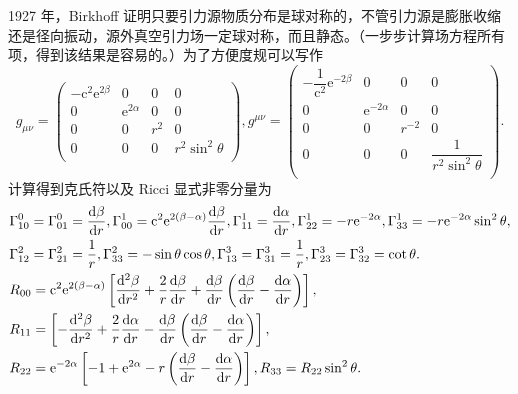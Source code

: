 \documentclass[11pt, a4paper, oneside, onecolumn]{ctexart}
\numberwithin{equation}{subsection}
\begin{document}
1927 年，Birkhoff 证明只要引力源物质分布是球对称的，不管引力源是膨胀收缩还是径向振动，源外真空引力场一定球对称，而且静态。（一步步计算场方程所有项，得到该结果是容易的。）为了方便度规可以写作
\begin{equation}
g_{\mu\nu}=\begin{pmatrix}
-\mathrm{c}^{2}\mathrm{e}^{2\beta} & 0 & 0 & 0\\
0 & \mathrm{e}^{2\alpha} & 0 & 0\\
0 & 0 & r^{2} & 0\\
0 & 0 & 0 & r^{2}\sin^{2}\theta\\
\end{pmatrix},
g^{\mu\nu}=\begin{pmatrix}
-\dfrac{1}{\mathrm{c}^{2}}\mathrm{e}^{-2\beta} & 0 & 0 & 0\\
0 & \mathrm{e}^{-2\alpha} & 0 & 0\\
0 & 0 & r^{-2} & 0\\
0 & 0 & 0 & \dfrac{1}{r^{2}\sin^{2}\theta}\\
\end{pmatrix}.
\end{equation}
计算得到克氏符以及 Ricci 显式非零分量为
\begin{align}
&\Gamma_{10}^{0}=\Gamma_{01}^{0}=\frac{\mathrm{d}\beta}{\mathrm{d}r},\Gamma_{00}^{1}=\mathrm{c}^{2}\mathrm{e}^{2\left(\beta-\alpha\right)}\frac{\mathrm{d}\beta}{\mathrm{d}r},\Gamma_{11}^{1}=\frac{\mathrm{d}\alpha}{\mathrm{d}r},\Gamma_{22}^{1}=-r\mathrm{e}^{-2\alpha},\Gamma_{33}^{1}=-r\mathrm{e}^{-2\alpha}\sin^{2}\theta,\notag\\
&\Gamma_{12}^{2}=\Gamma_{21}^{2}=\frac{1}{r},\Gamma_{33}^{2}=-\sin\theta\cos\theta,\Gamma_{13}^{3}=\Gamma_{31}^{3}=\frac{1}{r},\Gamma_{23}^{3}=\Gamma_{32}^{3}=\cot\theta.\notag\\
&R_{00}=\mathrm{c}^{2}\mathrm{e}^{2\left(\beta-\alpha\right)}\left[\frac{\mathrm{d}^{2}\beta}{\mathrm{d}r^{2}}+\frac{2}{r}\frac{\mathrm{d}\beta}{\mathrm{d}r}+\frac{\mathrm{d}\beta}{\mathrm{d}r}\left(\frac{\mathrm{d}\beta}{\mathrm{d}r}-\frac{\mathrm{d}\alpha}{\mathrm{d}r}\right)\right],\notag\\
&R_{11}=\left[-\frac{\mathrm{d}^{2}\beta}{\mathrm{d}r^{2}}+\frac{2}{r}\frac{\mathrm{d}\alpha}{\mathrm{d}r}-\frac{\mathrm{d}\beta}{\mathrm{d}r}\left(\frac{\mathrm{d}\beta}{\mathrm{d}r}-\frac{\mathrm{d}\alpha}{\mathrm{d}r}\right)\right],\notag\\
&R_{22}=\mathrm{e}^{-2\alpha}\left[-1+\mathrm{e}^{2\alpha}-r\left(\frac{\mathrm{d}\beta}{\mathrm{d}r}-\frac{\mathrm{d}\alpha}{\mathrm{d}r}\right)\right],R_{33}=R_{22}\sin^{2}\theta.\notag
\end{align}
\end{document}
